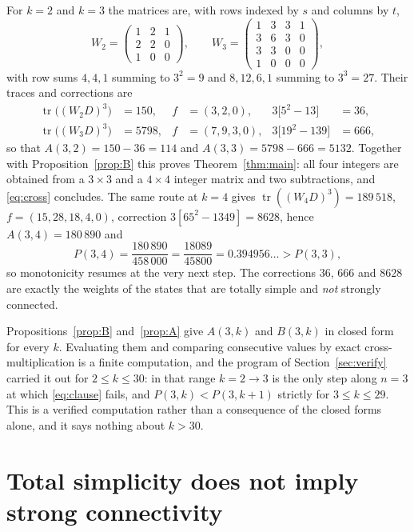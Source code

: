 \documentclass[11pt]{amsart}
\theoremstyle{remark}
\begin{document}
For $k=2$ and $k=3$ the matrices are, with rows indexed by $s$ and columns by $t$,
\[
  W_2=\begin{pmatrix}1&2&1\\2&2&0\\1&0&0\end{pmatrix},
  \qquad
  W_3=\begin{pmatrix}1&3&3&1\\3&6&3&0\\3&3&0&0\\1&0&0&0\end{pmatrix},
\]
with row sums $4,4,1$ summing to $3^2=9$ and $8,12,6,1$ summing to $3^3=27$.  Their
traces and corrections are
\begin{align*}
  \operatorname{tr}\bigl((W_2D)^3\bigr)&=150,
  & f&=(3,2,0),
  & 3\bigl[5^2-13\bigr]&=36,\\
  \operatorname{tr}\bigl((W_3D)^3\bigr)&=5798,
  & f&=(7,9,3,0),
  & 3\bigl[19^2-139\bigr]&=666,
\end{align*}
so that $A(3,2)=150-36=114$ and $A(3,3)=5798-666=5132$.
Together with Proposition~\ref{prop:B} this proves Theorem~\ref{thm:main}: all four
integers are obtained from a $3\times3$ and a $4\times4$ integer matrix and two
subtractions, and \eqref{eq:cross} concludes.  The same route at $k=4$ gives
$\operatorname{tr}((W_4D)^3)=189\,518$, $f=(15,28,18,4,0)$, correction
$3[65^2-1349]=8628$, hence $A(3,4)=180\,890$ and
\begin{equation}\label{eq:isolated}
  P(3,4)=\frac{180\,890}{458\,000}=\frac{18089}{45800}=0.394956\ldots>P(3,3),
\end{equation}
so monotonicity resumes at the very next step.  The corrections $36$, $666$ and $8628$ are
exactly the weights of the states that are totally simple and \emph{not} strongly
connected.

Propositions~\ref{prop:B} and~\ref{prop:A} give $A(3,k)$ and $B(3,k)$ in closed form for
every $k$.  Evaluating them and comparing consecutive values by exact cross-multiplication
is a finite computation, and the program of Section~\ref{sec:verify} carried it out for
$2\le k\le30$: in that range $k=2\to3$ is the only step along $n=3$ at which
\eqref{eq:clause} fails, and $P(3,k)<P(3,k+1)$ strictly for $3\le k\le29$.  This is a
verified computation rather than a consequence of the closed forms alone, and it says
nothing about $k>30$.

\section{Total simplicity does not imply strong connectivity}
\label{sec:secondary}
\end{document}
